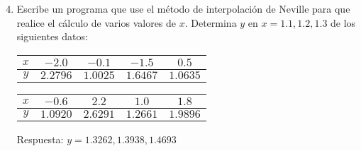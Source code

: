 \begin{frame}
\begin{enumerate}
\setcounter{enumi}{3}
\item Escribe un programa que use el método de interpolación de Neville para que realice el cálculo de varios valores de $x$. Determina $y$ en $x=1.1,1.2,1.3$ de los siguientes datos:
\begin{table}[htbp]
\centering 
\begin{tabulary}{15cm}{c | c | c | c | c |}
$x$ & $-2.0$ & $-0.1$ & $-1.5$ & $0.5$  \\
\midrule
$y$ & $2.2796$ & $1.0025$ & $1.6467$ & $1.0635$
\end{tabulary}
\end{table}
\begin{table}[htbp]
\centering 
\begin{tabulary}{15cm}{c | c | c | c | c |}
$x$ & $-0.6$ & $2.2$ & $1.0$ & $1.8$  \\
\midrule
$y$ & $1.0920$ & $2.6291$ & $1.2661$ & $1.9896$
\end{tabulary}
\end{table}
Respuesta: $y=1.3262,1.3938,1.4693$
\end{enumerate}
\end{frame}

